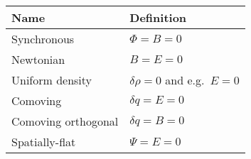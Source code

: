 \begin{tabular}{ll}
 \toprule
  Name & Definition \\
 \midrule
 \midrule
 Synchronous & \(\Phi=B=0\) \\
 Newtonian & \(B=E=0\) \\
 Uniform density & \(\delta\rho=0\) and e.g.\ \(E=0\) \\
 Comoving & \(\delta q = E = 0\) \\
 Comoving orthogonal & \(\delta q = B = 0\) \\
 Spatially-flat & \(\Psi=E=0\) \\
 \bottomrule
\end{tabular}
